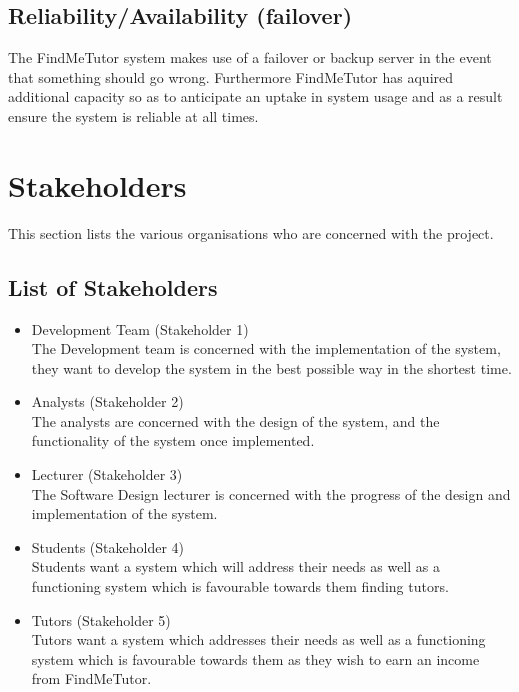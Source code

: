 \documentclass[12pt]{article}
\begin{document}
\subsection{Reliability/Availability (failover)}
The FindMeTutor system makes use of a failover or backup server in the event that something should go wrong. Furthermore FindMeTutor has aquired additional capacity so as to anticipate an uptake in system usage and as a result ensure the system is reliable at all times.

\pagebreak

\section{Stakeholders}
This section lists the various organisations who are concerned with the project.
\subsection{List of Stakeholders}
\begin{itemize}
\item Development Team (Stakeholder 1)\\
The Development team is concerned with the implementation of the system, they want to develop the system in the best possible way in the shortest time.

\item Analysts (Stakeholder 2)\\
The analysts are concerned with the design of the system, and the functionality of the system once implemented.

\item Lecturer (Stakeholder 3)\\
The Software Design lecturer is concerned with the progress of the design and implementation of the system.

\item Students (Stakeholder 4)\\
Students want a system which will address their needs as well as a functioning system which is favourable towards them finding tutors.

\item Tutors (Stakeholder 5)\\
Tutors want a system which addresses their needs as well as a functioning system which is favourable towards them as they wish to earn an income from FindMeTutor.
\end{itemize}

\pagebreak
\end{document}
